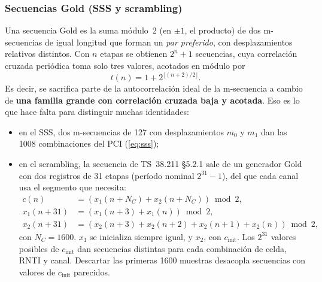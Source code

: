 \subsubsection{Secuencias Gold (SSS y scrambling)}
Una secuencia Gold es la suma módulo~2 (en $\pm 1$, el producto) de dos m-secuencias de igual longitud que forman un \emph{par preferido}, con desplazamientos relativos distintos. Con $n$ etapas se obtienen $2^n+1$ secuencias, cuya correlación cruzada periódica toma solo tres valores, acotados en módulo por
\begin{equation}
t(n) = 1 + 2^{\lfloor (n+2)/2\rfloor}.
\end{equation}
Es decir, se sacrifica parte de la autocorrelación ideal de la m-secuencia a cambio de \textbf{una familia grande con correlación cruzada baja y acotada}. Eso es lo que hace falta para distinguir muchas identidades:
\begin{itemize}
  \item en el SSS, dos m-secuencias de 127 con desplazamientos $m_0$ y $m_1$ dan las 1008 combinaciones del PCI (\cref{eq:sss});
  \item en el scrambling, la secuencia de TS~38.211 §5.2.1 sale de un generador Gold con dos registros de 31 etapas (período nominal $2^{31}-1$), del que cada canal usa el segmento que necesita:
  \begin{equation}
  \begin{aligned}
  c(n) &= \left(x_1(n+N_C) + x_2(n+N_C)\right)\bmod 2,\\
  x_1(n+31) &= \left(x_1(n+3)+x_1(n)\right)\bmod 2,\\
  x_2(n+31) &= \left(x_2(n+3)+x_2(n+2)+x_2(n+1)+x_2(n)\right)\bmod 2,
  \end{aligned}
  \label{eq:gold}
  \end{equation}
  con $N_C = 1600$. $x_1$ se inicializa siempre igual, y $x_2$, con $c_\text{init}$. Los $2^{31}$ valores posibles de $c_\text{init}$ dan secuencias distintas para cada combinación de celda, RNTI y canal. Descartar las primeras 1600 muestras desacopla secuencias con valores de $c_\text{init}$ parecidos.
\end{itemize}

